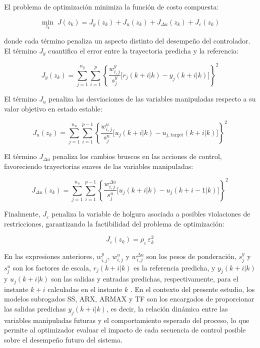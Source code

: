 El problema de optimización minimiza la función de costo compuesta:

\begin{equation}
    \min_{z_k}\; J(z_k) = J_y(z_k) + J_u(z_k) + J_{\Delta u}(z_k) + J_{\varepsilon}(z_k)
    \label{eq:OptimizationProblem}
\end{equation}

\noindent donde cada término penaliza un aspecto distinto del desempeño del controlador. El término $J_y$ cuantifica el error entre la trayectoria predicha y la referencia:

\begin{equation}
    J_y(z_k) = \sum_{j=1}^{n_y}\sum_{i=1}^{p}
        \left\{\frac{w_{i,j}^{y}}{s_j^{y}}\bigl[r_j(k+i|k) - y_j(k+i|k)\bigr]\right\}^2
    \label{eq:Jy}
\end{equation}

El término $J_u$ penaliza las desviaciones de las variables manipuladas respecto a su
valor objetivo en estado estable:

\begin{equation}
    J_u(z_k) = \sum_{j=1}^{n_u}\sum_{i=1}^{p-1}
        \left\{\frac{w_{i,j}^{u}}{s_j^{u}}\bigl[u_j(k+i|k) - u_{j,\mathrm{target}}(k+i|k)\bigr]\right\}^2
    \label{eq:Ju}
\end{equation}

El término $J_{\Delta u}$ penaliza los cambios bruscos en las acciones de control,
favoreciendo trayectorias suaves de las variables manipuladas:

\begin{equation}
    J_{\Delta u}(z_k) = \sum_{j=1}^{n_u}\sum_{i=1}^{p-1}
        \left\{\frac{w_{i,j}^{\Delta u}}{s_j^{u}}\bigl[u_j(k+i|k) - u_j(k+i-1|k)\bigr]\right\}^2
    \label{eq:Jdeltau}
\end{equation}

Finalmente, $J_{\varepsilon}$ penaliza la variable de holgura asociada a posibles
violaciones de restricciones, garantizando la factibilidad del problema de optimización:

\begin{equation}
    J_{\varepsilon}(z_k) = \rho_{\varepsilon}\,\varepsilon_k^2
    \label{eq:Jepsilon}
\end{equation}

\noindent En las expresiones anteriores, $w_{i,j}^{y}$, $w_{i,j}^{u}$ y
$w_{i,j}^{\Delta u}$ son los pesos de ponderación, $s_j^{y}$ y $s_j^{u}$ son los
factores de escala, $r_j(k+i|k)$ es la referencia predicha, y $y_j(k+i|k)$ y
$u_j(k+i|k)$ son las salidas y entradas predichas, respectivamente, para el instante
$k+i$ calculadas en el instante $k$ \cite{ref24}. En el contexto del presente estudio, los modelos subrogados SS, ARX, ARMAX y TF son los encargados de proporcionar las salidas predichas $y_j(k+i|k)$, es decir, la relación
dinámica entre las variables manipuladas futuras y el comportamiento esperado del proceso, lo que permite al optimizador evaluar el impacto de cada secuencia de control posible sobre el desempeño futuro del sistema.



